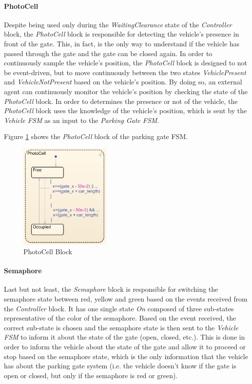 \paragraph{PhotoCell}

Despite being used only during the \textit{WaitingClearance} state of the \textit{Controller} block, the \textit{PhotoCell} block is responsible for detecting the vehicle's presence in front of the gate.
This, in fact, is the only way to understand if the vehicle has passed through the gate and the gate can be closed again.
In order to continuously sample the vehicle's position, the \textit{PhotoCell} block is designed to not be event-driven, but to move continuously between the two states \textit{VehiclePresent} and \textit{VehicleNotPresent} based on the vehicle's position.
By doing so, an external agent can continuously monitor the vehicle's position by checking the state of the \textit{PhotoCell} block.
In order to determines the presence or not of the vehicle, the \textit{PhotoCell} block uses the knowledge of the vehicle's position, which is sent by the \textit{Vehicle FSM} as an input to the \textit{Parking Gate FSM}.

Figure \ref{fig:photocell_block} shows the \textit{PhotoCell} block of the parking gate FSM.

\begin{figure}[H]
    \centering
    \includegraphics[width=0.4\textwidth]{./img/MATLAB/photocell_block.png}
    \caption{PhotoCell Block}
    \label{fig:photocell_block}
\end{figure}


\paragraph{Semaphore}

Last but not least, the \textit{Semaphore} block is responsible for switching the semaphore state between red, yellow and green based on the events received from the \textit{Controller} block.
It has one single state \textit{On} composed of  three sub-states representative of the color of the semaphore.
Based on the event received, the correct sub-state is chosen and the semaphore state is then sent to the \textit{Vehicle FSM} to inform it about the state of the gate (open, closed, etc.).
This is done in order to inform the vehicle about the state of the gate and allow it to proceed or stop based on the semaphore state, which is the only information that the vehicle has about the parking gate system (i.e. the vehicle doesn't know if the gate is open or closed, but only if the semaphore is red or green).

